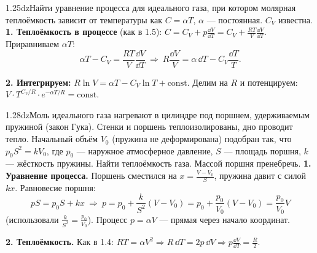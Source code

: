 \begin{problem}{1.25}{dz}{Найти уравнение процесса для идеального газа, при котором молярная теплоёмкость зависит от температуры как $C=\alpha T$, $\alpha$ — постоянная. $C_V$ известна.}
\textbf{1. Теплоёмкость в процессе} (как в 1.5): $C=C_V+p\frac{\dd V}{\dd T}=C_V+\frac{RT}{V}\frac{\dd V}{\dd T}$. Приравниваем $\alpha T$:
\[\alpha T-C_V=\frac{RT}{V}\frac{\dd V}{\dd T}\ \Rightarrow\ R\frac{\dd V}{V}=\alpha\,\dd T-C_V\frac{\dd T}{T}.\]

\textbf{2. Интегрируем:} $R\ln V=\alpha T-C_V\ln T+\text{const}$. Делим на $R$ и потенцируем: $V\cdot T^{C_V/R}\cdot e^{-\alpha T/R}=\text{const}$.
\end{problem}

\begin{problem}{1.28}{dz}{Моль идеального газа нагревают в цилиндре под поршнем, удерживаемым пружиной (закон Гука). Стенки и поршень теплоизолированы, дно проводит тепло.
Начальный объём $V_0$ (пружина не деформирована) подобран так, что $p_0S^2=kV_0$, где $p_0$ — наружное атмосферное давление, $S$ — площадь поршня,
$k$ — жёсткость пружины. Найти теплоёмкость газа. Массой поршня пренебречь.}
\textbf{1. Уравнение процесса.} Поршень сместился на $x=\frac{V-V_0}S$, пружина давит с силой $kx$. Равновесие поршня:
\[pS=p_0S+kx\ \Rightarrow\ p=p_0+\frac{k}{S^2}(V-V_0)=p_0+\frac{p_0}{V_0}(V-V_0)=\frac{p_0}{V_0}V\]
(использовали $\frac k{S^2}=\frac{p_0}{V_0}$). Процесс $p=\alpha V$ — прямая через начало координат.

\textbf{2. Теплоёмкость.} Как в 1.4: $RT=\alpha V^2\Rightarrow R\,\dd T=2p\,\dd V\Rightarrow p\frac{\dd V}{\dd T}=\frac R2$.
\end{problem}

